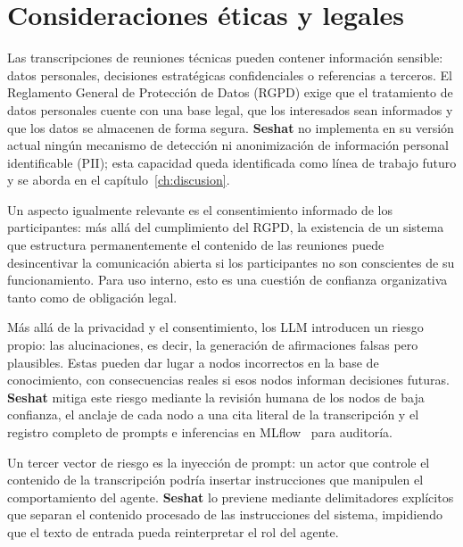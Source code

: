 \section{Consideraciones éticas y legales}

Las transcripciones de reuniones técnicas pueden contener información sensible: datos personales,
decisiones estratégicas confidenciales o referencias a terceros. El Reglamento General de
Protección de Datos (RGPD) exige que el tratamiento de datos personales cuente con una base
legal, que los interesados sean informados y que los datos se almacenen de forma segura.
\textbf{Seshat} no implementa en su versión actual ningún mecanismo de detección ni anonimización
de información personal identificable (PII); esta capacidad queda identificada como línea de
trabajo futuro y se aborda en el capítulo~\ref{ch:discusion}.

Un aspecto igualmente relevante es el consentimiento informado de los participantes: más allá del
cumplimiento del RGPD, la existencia de un sistema que estructura permanentemente el contenido de
las reuniones puede desincentivar la comunicación abierta si los participantes no son conscientes
de su funcionamiento. Para uso interno, esto es una cuestión de confianza organizativa tanto como
de obligación legal.

Más allá de la privacidad y el consentimiento, los \ac{LLM} introducen un riesgo propio: las
alucinaciones, es decir, la generación de afirmaciones falsas pero plausibles. Estas pueden dar
lugar a nodos incorrectos en la base de conocimiento, con consecuencias reales si esos nodos
informan decisiones futuras. \textbf{Seshat} mitiga este riesgo mediante la revisión humana de
los nodos de baja confianza, el anclaje de cada nodo a una cita literal de la transcripción y el
registro completo de prompts e inferencias en MLflow~\cite{zaharia2018mlflow} para auditoría.

Un tercer vector de riesgo es la inyección de prompt: un actor que controle el contenido de la
transcripción podría insertar instrucciones que manipulen el comportamiento del agente.
\textbf{Seshat} lo previene mediante delimitadores explícitos que separan el contenido procesado
de las instrucciones del sistema, impidiendo que el texto de entrada pueda reinterpretar el rol
del agente.
